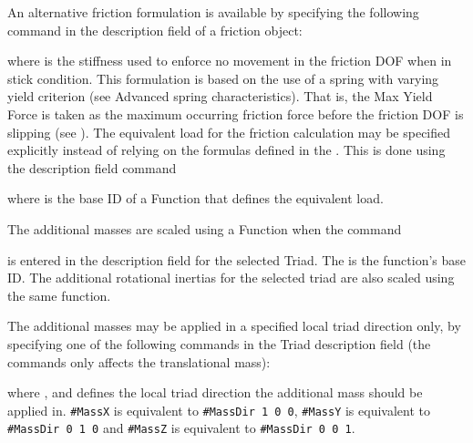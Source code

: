 
An alternative friction formulation is available by specifying the
following command in the description field of a friction object:


\noindent
where {\tt{}} is the stiffness used to enforce no movement in
the friction DOF when in stick condition.
This formulation is based on the use of a spring with varying yield criterion
(see 
{Advanced spring characteristics}). That is, the Max Yield Force is
taken as the maximum occurring friction force before the friction DOF
is slipping (see ).
The equivalent load for the friction calculation may be specified
explicitly instead of relying on the formulas defined in the
.
This is done using the description field command


\noindent
where {\tt{}} is the base ID of a Function that defines
the equivalent load.



The additional masses are scaled using a Function when the command


\noindent
is entered in the description field for the selected Triad.
The {\tt{}} is the function's base ID.
The additional rotational inertias for the selected triad are also scaled using
the same function.

The additional masses may be applied in a specified local triad direction only,
by specifying one of the following commands in the Triad description field
(the commands only affects the translational mass):



\noindent
where {\tt{}}, {\tt{}} and {\tt{}} defines the
local triad direction the additional mass should be applied in.
{\tt\#MassX} is equivalent to {\tt\#MassDir 1 0 0}, {\tt\#MassY} is equivalent
to {\tt\#MassDir 0 1 0} and {\tt\#MassZ} is equivalent to {\tt\#MassDir 0 0 1}.

